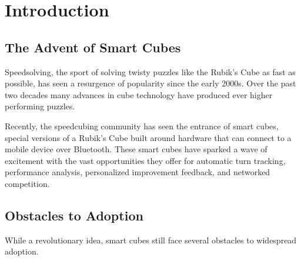 
\chapter{Introduction} %

\label{Chapter1} %



\section{The Advent of Smart Cubes}

Speedsolving, the sport of solving twisty puzzles like the Rubik's Cube
as fast as possible, has seen a resurgence of popularity since the
early 2000s. \cite{TODO} Over the past two decades many advances in
cube technology have produced ever higher performing puzzles.

Recently, the speedcubing community has seen the entrance of smart
cubes, special versions of a Rubik’s Cube built around hardware that
can connect to a mobile device over Bluetooth. These smart cubes have
sparked a wave of excitement with the vast opportunities they offer for
automatic turn tracking, performance analysis, personalized improvement
feedback, and networked competition.

\section{Obstacles to Adoption}

While a revolutionary idea, smart cubes still face several obstacles to
widespread adoption.

